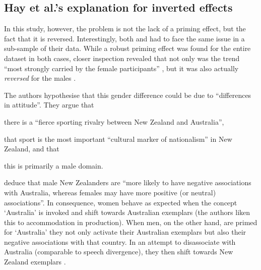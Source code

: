 		\subsection{Hay et al.'s explanation for inverted effects}

In this study, however, the problem is not the lack of a priming effect, but the fact that it is reversed.
Interestingly, both \textcite{hayetal2006a} and \textcite{haydrager2010} had to face the same issue in a sub-sample of their data.
While a robust priming effect was found for the entire dataset in both cases, closer inspection revealed that not only was the trend ``most strongly carried by the female participants'' \parencite[875]{haydrager2010}, but it was also actually \emph{reversed} for the males \parencite[cf.][876--877]{haydrager2010}.

The authors hypothesise that this gender difference could be due to ``differences in attitude''.
They argue that
	\begin{inparaenum}[(a)]
		\item there is a ``fierce sporting rivalry between New Zealand and Australia'',
		\item that sport is the most important ``cultural marker of nationalism'' in New Zealand, and that
		\item this is primarily a male domain.
	\end{inparaenum}
\citeauthor{haydrager2010} deduce that male New Zealanders are ``more likely to have negative associations with Australia, whereas females may have more positive (or neutral) associations''.
In consequence, women behave as expected when the concept `Australia' is invoked and shift towards Australian exemplars (the authors liken this to accommodation in production).
When men, on the other hand, are primed for `Australia' they not only activate their Australian exemplars but also their negative associations with that country.
In an attempt to disassociate with Australia (comparable to speech divergence), they then shift towards New Zealand exemplars \parencite[cf.][884--885]{haydrager2010}.

